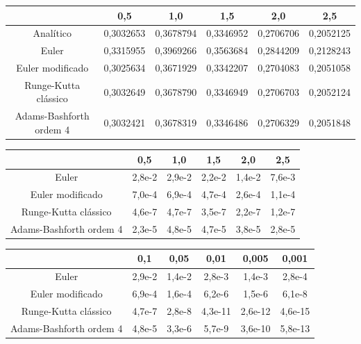 \begin{exer}
\begin{itemize}
\end{itemize}

\end{exer}


\begin{resp}

\begin{center}
\begin{tabular}{|c|c|c|c|c|c|}
\hline
&0,5&1,0&1,5&2,0&2,5\\
\hline
Analítico&  0,3032653 &   0,3678794  &  0,3346952  &  0,2706706 &   0,2052125  \\
\hline
Euler& 0,3315955 &   0,3969266 &   0,3563684 &   0,2844209  &  0,2128243\\
\hline
Euler modificado &0,3025634 &   0,3671929 &   0,3342207 &   0,2704083  &  0,2051058 \\
\hline
Runge-Kutta clássico& 0,3032649  &  0,3678790  &  0,3346949  &  0,2706703  &  0,2052124\\
\hline
Adams-Bashforth ordem 4& 0,3032421  &  0,3678319 &   0,3346486  &  0,2706329  &  0,2051848  \\
\hline
\end{tabular}
\end{center}


\begin{center}
\begin{tabular}{|c|c|c|c|c|c|}
\hline
&0,5&1,0&1,5&2,0&2,5\\
\hline
Euler& 2,8e-2  &  2,9e-2  &  2,2e-2  &  1,4e-2 &   7,6e-3\\
\hline
Euler modificado& 7,0e-4  &  6,9e-4   & 4,7e-4 &   2,6e-4 &   1,1e-4\\
\hline
Runge-Kutta clássico& 4,6e-7 &   4,7e-7    &3,5e-7  &  2,2e-7 &   1,2e-7\\
\hline
Adams-Bashforth ordem 4&  2,3e-5 &   4,8e-5  &  4,7e-5  &  3,8e-5  &  2,8e-5 \\
\hline
\end{tabular}
\end{center}

\begin{center}
\begin{tabular}{|c|c|c|c|c|c|}
\hline
&0,1&0,05&0,01&0,005&0,001\\
\hline
Euler&2,9e-2&1,4e-2&2,8e-3&1,4e-3&2,8e-4\\
\hline
Euler modificado&6,9e-4&1,6e-4&6,2e-6&1,5e-6&6,1e-8\\
\hline
Runge-Kutta clássico&4,7e-7&2,8e-8&4,3e-11&2,6e-12&4,6e-15\\
\hline
Adams-Bashforth ordem 4&4,8e-5&3,3e-6&5,7e-9&3,6e-10&5,8e-13  \\
\hline
\end{tabular}
\end{center}

\end{resp}

